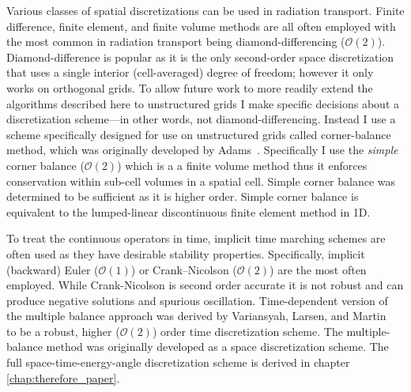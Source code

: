 Various classes of spatial discretizations can be used in radiation transport.
Finite difference, finite element, and finite volume methods are all often employed with the most common in radiation transport being diamond-differencing ($\mathcal{O}(2)$).
Diamond-difference is popular as it is the only second-order space discretization that uses a single interior (cell-averaged) degree of freedom; however it only works on orthogonal grids.
To allow future work to more readily extend the algorithms described here to unstructured grids I make specific decisions about a discretization scheme---in other words, not diamond-differencing.
Instead I use a scheme specifically designed for use on unstructured grids called corner-balance method, which was originally developed by Adams~\cite{adams_subcell_1997}.
Specifically I use the \emph{simple} corner balance ($\mathcal{O}(2)$) which is a a finite volume method thus it enforces conservation within sub-cell volumes in a spatial cell.
Simple corner balance was determined to be sufficient as it is higher  order.
Simple corner balance is equivalent to the lumped-linear discontinuous finite element method in 1D.

To treat the continuous operators in time, implicit time marching schemes are often used as they have desirable stability properties.
Specifically, implicit (backward) Euler ($\mathcal{O}(1)$) or Crank--Nicolson ($\mathcal{O}(2)$) \cite{nicolson_phd, Crank_Nicolson_1947} are the most often employed.
While Crank-Nicolson is second order accurate it is not robust and can produce negative solutions and spurious oscillation.
Time-dependent version of the multiple balance approach was derived by Variansyah, Larsen, and Martin~\cite{variansyah_robust_2021, ilham_phd} to be a robust, higher ($\mathcal{O}(2)$) order time discretization scheme.
The multiple-balance method was originally developed as a space discretization scheme.
The full space-time-energy-angle discretization scheme is derived in chapter \ref{chap:therefore_paper}. %

